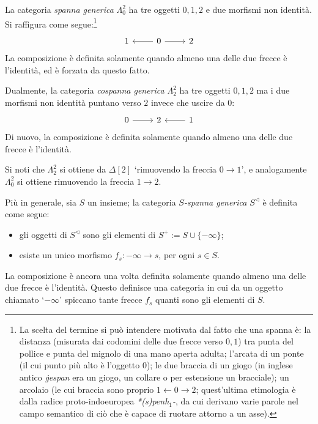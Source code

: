 \begin{example}\label{ex_spancospan}
	La categoria \emph{spanna generica}
	\(\Lambda^2_0\) ha tre oggetti \(0,1,2\) e due morfismi non identità. Si raffigura come segue:\footnote{La scelta del termine si può intendere motivata dal fatto che una spanna è: la distanza (misurata dai codomini delle due frecce verso \(0,1\)) tra punta del pollice e punta del mignolo di una mano aperta adulta; l'arcata di un ponte (il cui punto più alto è l'oggetto \(0\)); le due braccia di un giogo (in inglese antico \emph{ġespan} era un giogo, un collare o per estensione un bracciale); un arcolaio (le cui braccia sono proprio \(1\leftarrow 0\to 2\); quest'ultima etimologia è dalla radice proto-indoeuropea \emph{*(s)penh\(_1\)-}, da cui derivano varie parole nel campo semantico di ciò che è capace di ruotare attorno a un asse).}
	\[\begin{tikzcd}
			1 & 0 \ar[r]\ar[l] & 2
		\end{tikzcd}\]
	La composizione è definita solamente quando almeno una delle due frecce è l'identità, ed è forzata da questo fatto.

	Dualmente, la categoria \emph{cospanna generica} \(\Lambda^2_2\) ha tre oggetti \(0,1,2\) ma i due morfismi non identità puntano verso \(2\) invece che uscire da \(0\):
	\[\begin{tikzcd}
			0\ar[r] & 2 & 1\ar[l]
		\end{tikzcd}\]
	Di nuovo, la composizione è definita solamente quando almeno una delle due frecce è l'identità.

	Si noti che \(\Lambda^2_2\) si ottiene da \(\Delta[2]\) `rimuovendo la freccia \(0\to 1\)', e analogamente \(\Lambda^2_0\) si ottiene rimuovendo la freccia \(1\to 2\).

	Più in generale, sia \(S\) un insieme; la categoria \emph{\(S\)-spanna generica} \(S^\lhd\) è definita come segue:
	\begin{itemize}
		\item gli oggetti di \(S^\lhd\) sono gli elementi di \(S^+ := S\cup \{-\infty\}\);
		\item esiste un unico morfismo \(f_s : -\infty\to s\), per ogni \(s\in S\).
	\end{itemize}
	La composizione è ancora una volta definita solamente quando almeno una delle due frecce è l'identità. Questo definisce una categoria in cui da un oggetto chiamato `\(-\infty\)' spiccano tante frecce \(f_s\) quanti sono gli elementi di \(S\).


\end{example}
